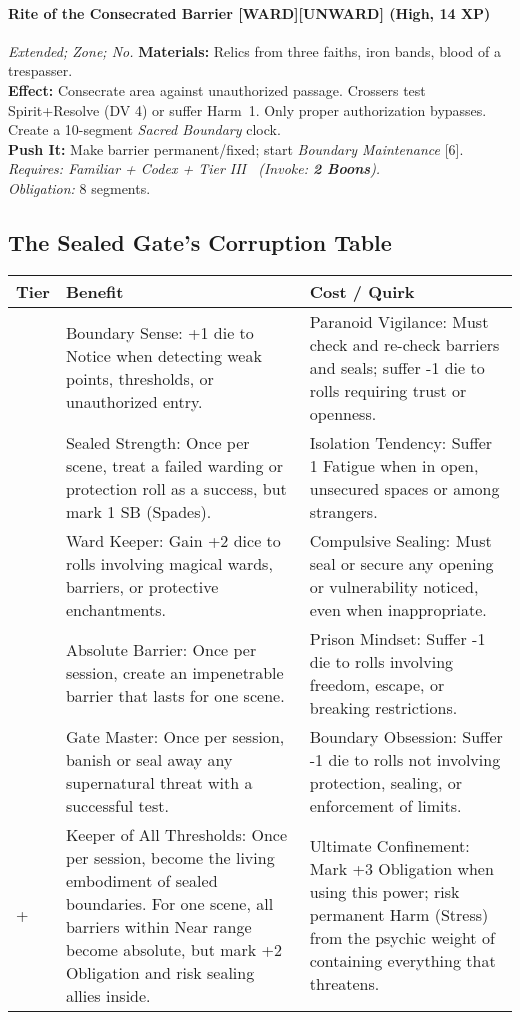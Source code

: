 \paragraph{Rite of the Consecrated Barrier \textnormal{[WARD][UNWARD]} (High, 14 XP)} \emph{Extended; Zone; No.}
\textbf{Materials:} Relics from three faiths, iron bands, blood of a trespasser.\\
\textbf{Effect:} Consecrate area against unauthorized passage. Crossers test Spirit+Resolve (DV 4) or suffer Harm~1. Only proper authorization bypasses. Create a 10-segment \emph{Sacred Boundary} clock.\\
\textbf{Push It:} Make barrier permanent/fixed; start \emph{Boundary Maintenance} [6].\\
\emph{Requires: Familiar + Codex + Tier III \ (\textit{Invoke:} \textbf{2 Boons}).}\\
\emph{Obligation:} 8 segments.

\subsection*{The Sealed Gate's Corruption Table}
\label{sec:sealed-gate-corruption}

\begin{longtable}{>{\raggedright\arraybackslash}p{1cm} p{5cm} p{5cm}}
\toprule
\textbf{Tier} & \textbf{Benefit} & \textbf{Cost / Quirk} \\
\midrule
1 & Boundary Sense: +1 die to Notice when detecting weak points, thresholds, or unauthorized entry. & Paranoid Vigilance: Must check and re-check barriers and seals; suffer -1 die to rolls requiring trust or openness. \\
\midrule
2 & Sealed Strength: Once per scene, treat a failed warding or protection roll as a success, but mark 1 SB (Spades). & Isolation Tendency: Suffer 1 Fatigue when in open, unsecured spaces or among strangers. \\
\midrule
3 & Ward Keeper: Gain +2 dice to rolls involving magical wards, barriers, or protective enchantments. & Compulsive Sealing: Must seal or secure any opening or vulnerability noticed, even when inappropriate. \\
\midrule
4 & Absolute Barrier: Once per session, create an impenetrable barrier that lasts for one scene. & Prison Mindset: Suffer -1 die to rolls involving freedom, escape, or breaking restrictions. \\
\midrule
5 & Gate Master: Once per session, banish or seal away any supernatural threat with a successful test. & Boundary Obsession: Suffer -1 die to rolls not involving protection, sealing, or enforcement of limits. \\
\midrule
6+ & Keeper of All Thresholds: Once per session, become the living embodiment of sealed boundaries. For one scene, all barriers within Near range become absolute, but mark +2 Obligation and risk sealing allies inside. & Ultimate Confinement: Mark +3 Obligation when using this power; risk permanent Harm (Stress) from the psychic weight of containing everything that threatens. \\
\bottomrule
\end{longtable}